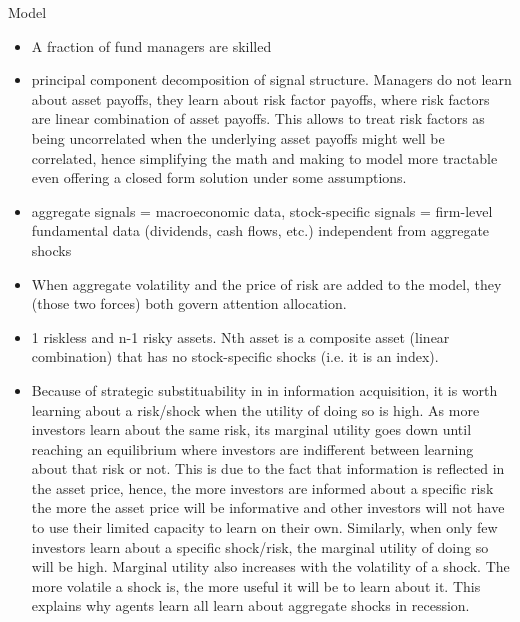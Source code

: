 Model
\begin{itemize}
    \item A fraction of fund managers are skilled
    \item principal component decomposition of signal structure. Managers do not learn about asset payoffs, they learn about risk factor payoffs, where risk factors are linear combination of asset payoffs. This allows to treat risk factors as being uncorrelated when the underlying asset payoffs might well be correlated, hence simplifying the math and making to model more tractable even offering a closed form solution under some assumptions.
    \item aggregate signals = macroeconomic data, stock-specific signals = firm-level fundamental data (dividends, cash flows, etc.) independent from aggregate shocks
    \item When aggregate volatility and the price of risk are added to the model, they (those two forces) both govern attention allocation.
    \item 1 riskless and n-1 risky assets. Nth asset is a composite asset (linear combination) that has no stock-specific shocks (i.e. it is an index).
    \item Because of strategic substituability in in information acquisition, it is worth learning about a risk/shock when the utility of doing so is high. As more investors learn about the same risk, its marginal utility goes down until reaching an equilibrium where investors are indifferent between learning about that risk or not. This is due to the fact that information is reflected in the asset price, hence, the more investors are informed about a specific risk the more the asset price will be informative and other investors will not have to use their limited capacity to learn on their own. Similarly, when only few investors learn about a specific shock/risk, the marginal utility of doing so will be high. Marginal utility also increases with the volatility of a shock. The more volatile a shock is, the more useful it will be to learn about it. This explains why agents learn all learn about aggregate shocks in recession.
\end{itemize}

